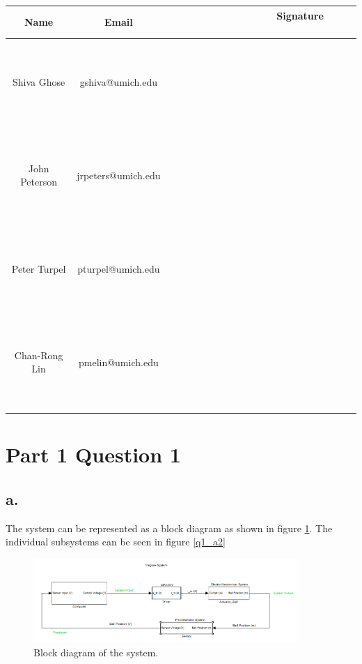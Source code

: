 \documentclass{article}
\theoremstyle{plain}
\theoremstyle{definition}
\theoremstyle{remark}
\begin{document}
\begin{table}[h]
\begin{center}
    \begin{tabular}{|c|c|c|}
        \hline
        \textbf{Name} & \textbf{Email}     & \textbf{ \ \ \ \ \  \ \  \ \ \ \ \  \ \ Signature  \ \ \ \ \  \ \ \ \ \ \ \  \ \ } \\ \hline
        	~& ~& ~\\
	~& ~& ~\\
	Shiva Ghose   & gshiva@umich.edu   & ~                  \\
	~& ~& ~\\
	~& ~& ~\\ \hline 
	~& ~& ~\\
	~& ~& ~\\
        John Peterson & jrpeters@umich.edu & ~                  \\ 
	~& ~& ~\\
	~& ~& ~\\ \hline 
	~& ~& ~\\
	~& ~& ~\\
        Peter Turpel   & pturpel@umich.edu & ~                  \\
	~& ~& ~\\
	~& ~& ~\\ \hline 
	~& ~& ~\\
	~& ~& ~\\
        Chan-Rong Lin   & pmelin@umich.edu & ~                  \\
	~& ~& ~\\
	~& ~& ~\\ \hline 
        \hline
    \end{tabular}
\end{center}
\end{table}

\newpage


\section*{Part 1 Question 1}
\subsection*{a.}
The system can be represented as a block diagram as shown in figure \ref{q1_a1}. The individual subsystems can be seen in figure \ref{q1_a2}
\begin{figure}[h]
\begin{center}
\includegraphics[width=10cm]{MagLevSystem.png}
\end{center}
\caption{Block diagram of the system.}
\label{q1_a1}
\end{figure}
\end{document}
